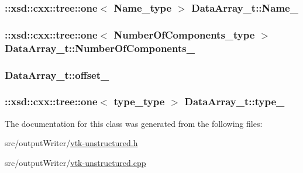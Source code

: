 \subsubsection[{\texorpdfstring{Name\+\_\+}{Name_}}]{\setlength{\rightskip}{0pt plus 5cm}\+::xsd\+::cxx\+::tree\+::one$<$ {\bf Name\+\_\+type} $>$ Data\+Array\+\_\+t\+::\+Name\+\_\+\hspace{0.3cm}{\ttfamily [protected]}}\hypertarget{classDataArray__t_a75c5be79f9202ea631b90bc7ab6572ac}{}\label{classDataArray__t_a75c5be79f9202ea631b90bc7ab6572ac}
\subsubsection[{\texorpdfstring{Number\+Of\+Components\+\_\+}{NumberOfComponents_}}]{\setlength{\rightskip}{0pt plus 5cm}\+::xsd\+::cxx\+::tree\+::one$<$ {\bf Number\+Of\+Components\+\_\+type} $>$ Data\+Array\+\_\+t\+::\+Number\+Of\+Components\+\_\+\hspace{0.3cm}{\ttfamily [protected]}}\hypertarget{classDataArray__t_ae0e1c29893204a5066b86ffe5101d176}{}\label{classDataArray__t_ae0e1c29893204a5066b86ffe5101d176}
\subsubsection[{\texorpdfstring{offset\+\_\+}{offset_}}]{ Data\+Array\+\_\+t\+::offset\+\_\+\hspace{0.3cm}{\ttfamily [protected]}}\hypertarget{classDataArray__t_a6479c8a02a37c84956afb645b247ef0e}{}\label{classDataArray__t_a6479c8a02a37c84956afb645b247ef0e}
\subsubsection[{\texorpdfstring{type\+\_\+}{type_}}]{\setlength{\rightskip}{0pt plus 5cm}\+::xsd\+::cxx\+::tree\+::one$<$ {\bf type\+\_\+type} $>$ Data\+Array\+\_\+t\+::type\+\_\+\hspace{0.3cm}{\ttfamily [protected]}}\hypertarget{classDataArray__t_a213841b0371a05383d0de7b8cf35c571}{}\label{classDataArray__t_a213841b0371a05383d0de7b8cf35c571}


The documentation for this class was generated from the following files\+:\begin{DoxyCompactItemize}
\item 
src/output\+Writer/\hyperlink{vtk-unstructured_8h}{vtk-\/unstructured.\+h}\item 
src/output\+Writer/\hyperlink{vtk-unstructured_8cpp}{vtk-\/unstructured.\+cpp}\end{DoxyCompactItemize}
